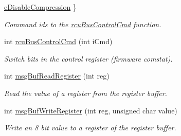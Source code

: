 \begin{CompactItemize}
\par
\hyperlink{group__dcsc__msg__buffer__access_ggb04a0655cd1e3bcac5e8f48c18df1a57a371d588d9e5eb297b5e8c39d62bfe1c}{e\-Disable\-Compression}
 \}
\begin{CompactList}\small\item\em Command ids to the \hyperlink{group__dcsc__msg__buffer__access_gf74b29f8ded2feb57974c95e4863eac8}{rcu\-Bus\-Control\-Cmd} function. \item\end{CompactList}\item 
int \hyperlink{group__dcsc__msg__buffer__access_gf74b29f8ded2feb57974c95e4863eac8}{rcu\-Bus\-Control\-Cmd} (int i\-Cmd)
\begin{CompactList}\small\item\em Switch bits in the control register (firmware comstat). \item\end{CompactList}\item 
int \hyperlink{group__dcsc__msg__buffer__access_g7a5b0d57fbd0a68206468a01b0a63520}{msg\-Buf\-Read\-Register} (int reg)
\begin{CompactList}\small\item\em Read the value of a register from the register buffer. \item\end{CompactList}\item 
int \hyperlink{group__dcsc__msg__buffer__access_g82e19c9d34c7ecebcba115d2a6393b6c}{msg\-Buf\-Write\-Register} (int reg, unsigned char value)
\begin{CompactList}\small\item\em Write an 8 bit value to a register of the register buffer. \item\end{CompactList}\end{CompactItemize}
